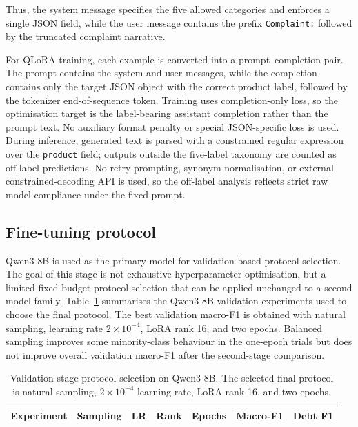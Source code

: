 \documentclass{elektr}
\begin{document}
Thus, the system message specifies the five allowed categories and enforces a single JSON field, while the user message contains the prefix \texttt{Complaint:} followed by the truncated complaint narrative.

For QLoRA training, each example is converted into a prompt--completion pair. The prompt contains the system and user messages, while the completion contains only the target JSON object with the correct product label, followed by the tokenizer end-of-sequence token. Training uses completion-only loss, so the optimisation target is the label-bearing assistant completion rather than the prompt text. No auxiliary format penalty or special JSON-specific loss is used. During inference, generated text is parsed with a constrained regular expression over the \texttt{product} field; outputs outside the five-label taxonomy are counted as off-label predictions. No retry prompting, synonym normalisation, or external constrained-decoding API is used, so the off-label analysis reflects strict raw model compliance under the fixed prompt.

\subsection{Fine-tuning protocol}

Qwen3-8B is used as the primary model for validation-based protocol selection. The goal of this stage is not exhaustive hyperparameter optimisation, but a limited fixed-budget protocol selection that can be applied unchanged to a second model family. Table~\ref{tab:protocol-selection} summarises the Qwen3-8B validation experiments used to choose the final protocol. The best validation macro-F1 is obtained with natural sampling, learning rate $2\times10^{-4}$, LoRA rank 16, and two epochs. Balanced sampling improves some minority-class behaviour in the one-epoch trials but does not improve overall validation macro-F1 after the second-stage comparison.

\begin{table}[h!]
\caption{Validation-stage protocol selection on Qwen3-8B. The selected final protocol is natural sampling, $2\times10^{-4}$ learning rate, LoRA rank 16, and two epochs.}
\label{tab:protocol-selection}
\begin{center}
\begin{tabular}{llrrrrr}
\hline
Experiment & Sampling & LR & Rank & Epochs & Macro-F1 & Debt F1\\
\hline

\end{tabular}
\end{center}
\end{table}
\end{document}
